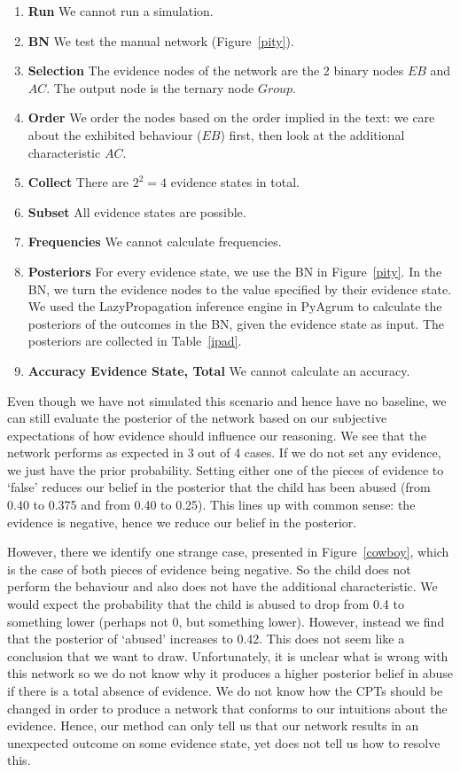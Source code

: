 \documentclass[12pt]{article}
\begin{document}
\begin{enumerate}
\item \textbf{Run} We cannot run a simulation.
\item \textbf{BN} We test the manual network (Figure~\ref{pity}).
\item \textbf{Selection} The evidence nodes of the network are the 2 binary nodes $EB$ and $AC$. The output node is the ternary node $Group$.
\item \textbf{Order} We order the nodes based on the order implied in the text: we care about the exhibited behaviour ($EB$) first, then look at the additional characteristic $AC$.
\item \textbf{Collect} There are $2^2 = 4$ evidence states in total.
\item \textbf{Subset} All evidence states are possible.
\item \textbf{Frequencies} We cannot calculate frequencies.
\item \textbf{Posteriors} For every evidence state, we use the BN in Figure~\ref{pity}. In the BN, we turn the evidence nodes to the value specified by their evidence state. We used the LazyPropagation inference engine in PyAgrum to calculate the posteriors of the outcomes in the BN, given the evidence state as input. The posteriors are collected in Table~\ref{ipad}. 
\item \textbf{Accuracy Evidence State, Total} We cannot calculate an accuracy.
\end{enumerate}

Even though we have not simulated this scenario and hence have no baseline, we can still evaluate the posterior of the network based on our subjective expectations of how evidence should influence our reasoning. We see that the network performs as expected in 3 out of 4 cases. If we do not set any evidence, we just have the prior probability. Setting either one of the pieces of evidence to `false' reduces our belief in the posterior that the child has been abused (from 0.40 to 0.375 and from 0.40 to 0.25). This lines up with common sense: the evidence is negative, hence we reduce our belief in the posterior.

However, there we identify one strange case, presented in Figure~\ref{cowboy}, which is the case of both pieces of evidence being negative. So the child does not perform the behaviour and also does not have the additional characteristic. We would expect the probability that the child is abused to drop from 0.4 to something lower (perhaps not 0, but something lower). However, instead we find that the posterior of `abused' increases to 0.42. This does not seem like a conclusion that we want to draw. Unfortunately, it is unclear what is wrong with this network so we do not know why it produces a higher posterior belief in abuse if there is a total absence of evidence. We do not know how the CPTs should be changed in order to produce a network that conforms to our intuitions about the evidence. Hence, our method can only tell us that our network results in an unexpected outcome on some evidence state, yet does not tell us how to resolve this. 
\end{document}
